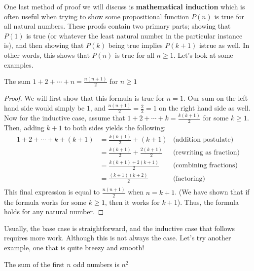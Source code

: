 One last method of proof we will discuss is \textbf{mathematical induction} which is often useful when trying to show some propositional function $P(n)$ is true for all natural numbers. These proofs contain two primary parts; showing that $P(1)$ is true (or whatever the least natural number in the particular instance is), and then showing that $P(k)$ being true implies $P(k+1)$ istrue as well. In other words, this shows that $P(n)$ is true for all $n\geq 1$. Let's look at some examples. 

\begin{theorem}
    The sum $1+2+\cdots +n=\frac{n(n+1)}{2}$ for $n\geq 1$
\end{theorem}
\vspace{-4mm}
\begin{proof}
    We will first show that this formula is true for $n=1$. Our sum on the left hand side would simply be $1$, and $\frac{n(n+1)}{2}=\frac{2}{2}=1$ on the right hand side as well. Now for the inductive case, assume that $1+2+\cdots +k=\frac{k(k+1)}{2}$ for some $k\geq 1$. Then, adding $k+1$ to both sides yields the following:
    \begin{align*}
       1+2+\cdots +k+(k+1)&=\frac{k(k+1)}{2}+(k+1) &\text{(addition postulate)} \\
         &=\frac{k(k+1)}{2} +\frac{2(k+1)}{2} &\text{(rewriting as fraction)}\\
         &=\frac{k(k+1)+2(k+1)}{2}  &\text{(combining fractions)}\\
         &=\frac{(k+1)(k+2)}{2}  &\text{(factoring)}\\
    \end{align*}
    This final expression is equal to $\frac{n(n+1)}{2}$ when $n=k+1$. (We have shown that if the formula works for some $k\geq 1$, then it works for $k+1$). Thus, the formula holds for any natural number. 
\end{proof}

Usually, the base case is straightforward, and the inductive case that follows requires more work. Although this is not always the case. Let's try another example, one that is quite breezy and smooth!



\begin{theorem}
    The sum of the first $n$ odd numbers is $n^2$
\end{theorem}

